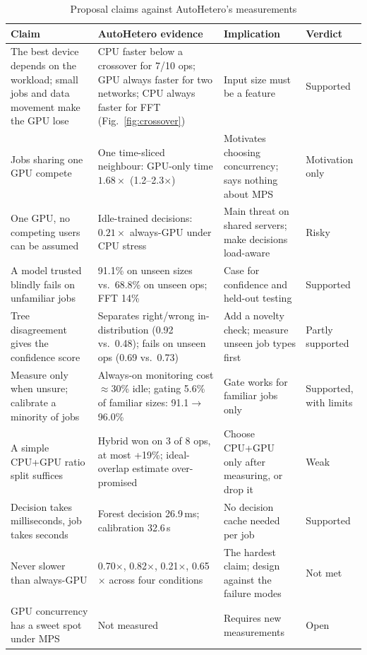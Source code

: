 \documentclass[conference]{IEEEtran}
\begin{document}
\begin{table}[t]
\centering
\caption{Proposal claims against AutoHetero's measurements}
\label{tab:map}
\renewcommand{\arraystretch}{1.12}
\begin{tabular}{@{}p{3.7cm}p{6.8cm}p{3.4cm}l@{}}
\toprule
Claim & AutoHetero evidence & Implication & Verdict \\
\midrule
The best device depends on the workload; small jobs and data movement make the GPU lose &
CPU faster below a crossover for 7/10 ops; GPU always faster for two networks; CPU always faster for FFT (Fig.~\ref{fig:crossover}) &
Input size must be a feature & Supported \\
Jobs sharing one GPU compete &
One time-sliced neighbour: GPU-only time $1.68\times$ (1.2--2.3$\times$) &
Motivates choosing concurrency; says nothing about MPS & Motivation only \\
One GPU, no competing users can be assumed &
Idle-trained decisions: $0.21\times$ always-GPU under CPU stress &
Main threat on shared servers; make decisions load-aware & Risky \\
A model trusted blindly fails on unfamiliar jobs &
91.1\% on unseen sizes vs.\ 68.8\% on unseen ops; FFT 14\% &
Case for confidence and held-out testing & Supported \\
Tree disagreement gives the confidence score &
Separates right/wrong in-distribution (0.92 vs.\ 0.48); fails on unseen ops (0.69 vs.\ 0.73) &
Add a novelty check; measure unseen job types first & Partly supported \\
Measure only when unsure; calibrate a minority of jobs &
Always-on monitoring cost $\approx$30\% idle; gating 5.6\% of familiar sizes: 91.1$\to$96.0\% &
Gate works for familiar jobs only & Supported, with limits \\
A simple CPU+GPU ratio split suffices &
Hybrid won on 3 of 8 ops, at most +19\%; ideal-overlap estimate over-promised &
Choose CPU+GPU only after measuring, or drop it & Weak \\
Decision takes milliseconds, job takes seconds &
Forest decision 26.9\,ms; calibration 32.6\,s &
No decision cache needed per job & Supported \\
Never slower than always-GPU &
0.70$\times$, 0.82$\times$, 0.21$\times$, 0.65$\times$ across four conditions &
The hardest claim; design against the failure modes & Not met \\
GPU concurrency has a sweet spot under MPS &
Not measured &
Requires new measurements & Open \\
\bottomrule
\end{tabular}
\end{table}
\end{document}
